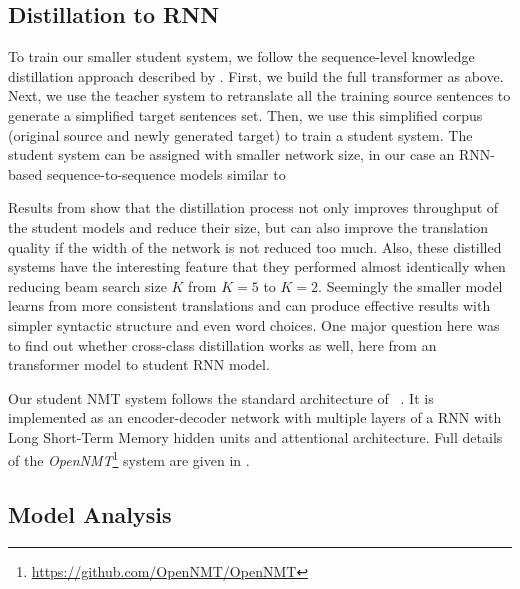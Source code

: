 \documentclass[11pt,a4paper]{article}
\begin{document}
\subsection{Distillation to RNN}
\label{distill}

To train our smaller student system, we follow the sequence-level
knowledge distillation approach described by
. First, we build the full transformer as
above. Next, we use the teacher system to retranslate all the training
source sentences to generate a simplified target sentences set.  Then,
we use this simplified corpus (original source and newly generated
target) to train a student system.  The student system can be assigned
with smaller network size, in our case an RNN-based
sequence-to-sequence models similar to 

Results from  show that the
distillation process not only improves throughput of the student
models and reduce their size, but can also improve the translation
quality if the width of the network is not reduced too much. Also,
these distilled systems have the interesting feature that they
performed almost identically when reducing beam search size $K$ from
$K=5$ to $K=2$. Seemingly the smaller model learns from more consistent
translations and can produce effective results with simpler syntactic
structure and even word choices. One major question here was to find
out whether cross-class distillation works as well, here from an
transformer model to student RNN model.

Our student NMT system follows the standard architecture of
~. It is implemented as an
encoder-decoder network with multiple layers of a RNN with Long
Short-Term Memory hidden \cite{Hochreiter:1997:LSM:1246443.1246450} units and attentional architecture. Full details of the
\textit{OpenNMT}\footnote{\url{https://github.com/OpenNMT/OpenNMT}}
system are given in .


\subsection{Model Analysis}
\label{seq2seq}
\end{document}
